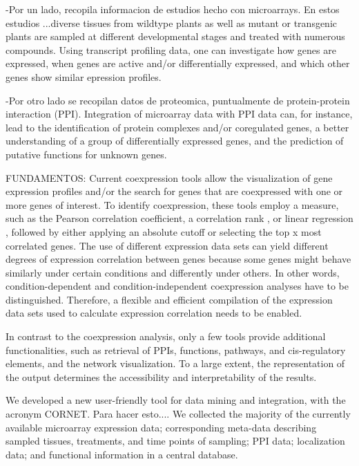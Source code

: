 \documentclass[a4paper,10pt]{article}
\begin{document}
\begin{itemize}
-Por un lado, recopila informacion de estudios hecho con microarrays.
En estos estudios ...diverse tissues from wildtype plants as well as mutant or transgenic plants are sampled at different developmental stages and treated with numerous compounds.
Using transcript profiling data, one can investigate how genes are expressed, when genes are active and/or differentially expressed, and which other genes show similar epression profiles. 

-Por otro lado se recopilan datos de proteomica, puntualmente de protein-protein interaction (PPI).
Integration of microarray data with PPI data can, for instance, lead to the identification of protein complexes and/or coregulated genes, a better understanding of a group of differentially expressed genes, and the prediction of putative functions for unknown genes.



FUNDAMENTOS:
Current coexpression tools allow the visualization of gene expression profiles and/or the search for genes that are coexpressed with one or more genes of interest. To identify coexpression, these tools employ a measure, such as the Pearson correlation coefficient, a correlation rank , or linear regression , followed by either applying an absolute cutoff or selecting the
top x most correlated genes.
The use of different expression data sets can yield different degrees of expression correlation between genes because some genes might behave similarly under certain conditions and differently under others. In other words, condition-dependent and condition-independent coexpression analyses have to be distinguished. Therefore, a flexible and efficient compilation of the expression data sets used to calculate expression correlation needs to be enabled.

In contrast to the coexpression analysis, only a few tools provide additional functionalities, such as retrieval of PPIs, functions, pathways, and cis-regulatory elements, and the network visualization. 
To a large extent, the representation of the output determines the accessibility and interpretability of the results.


We developed a new user-friendly tool for data mining and integration, with the acronym CORNET.
Para hacer esto.... We collected the majority of the currently available microarray expression data; corresponding meta-data describing sampled tissues, treatments, and time points of sampling; PPI data; localization data; and functional information in a central database.


\end{itemize}
\end{document}
